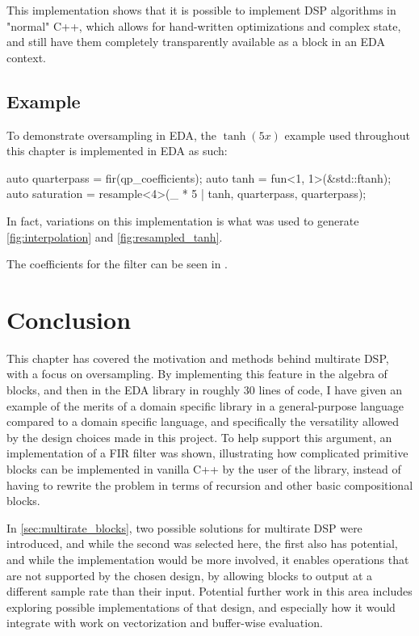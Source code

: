 This implementation shows that it is possible to implement DSP algorithms in "normal" C++, which allows for
hand-written optimizations and complex state, and still have them completely transparently available as a
block in an EDA context.

\subsection{Example}

To demonstrate oversampling in EDA, the $\tanh(5x)$ example used throughout this chapter is
implemented in EDA as such:

\begin{cppcodenl}
auto quarterpass = fir(qp_coefficients);
auto tanh = fun<1, 1>(&std::ftanh);
auto saturation = resample<4>(_ * 5 | tanh, quarterpass, quarterpass);
\end{cppcodenl}

In fact, variations on this implementation is what was used to generate \autoref{fig:interpolation} and
\autoref{fig:resampled_tanh}.

The coefficients for the filter can be seen in .

\section{Conclusion}

This chapter has covered the motivation and methods behind multirate DSP, with a focus on oversampling. By
implementing this feature in the algebra of blocks, and then in the EDA library in roughly 30 lines of code,
I have given an example of the merits of a domain specific library in a general-purpose language compared to
a domain specific language, and specifically the versatility allowed by the design choices made in this
project. To help support this argument, an implementation of a FIR filter was shown, illustrating how
complicated primitive blocks can be implemented in vanilla C++ by the user of the library, instead of having
to rewrite the problem in terms of recursion and other basic compositional blocks.

In \autoref{sec:multirate_blocks}, two possible solutions for multirate DSP were introduced, and while the second
was selected here, the first also has potential, and while the implementation would be more involved, it
enables operations that are not supported by the chosen design, by allowing blocks to output at a different
sample rate than their input. Potential further work in this area includes exploring possible implementations
of that design, and especially how it would integrate with work on vectorization and buffer-wise evaluation.
